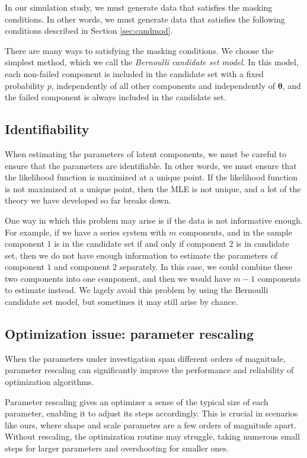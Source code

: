 \documentclass[
]{article}
\begin{document}
In our simulation study, we must generate data that satisfies the
masking conditions. In other words, we must generate data that satisfies
the following conditions described in Section \ref{sec:candmod}.

There are many ways to satisfying the masking conditions. We choose the
simplest method, which we call the \emph{Bernoulli candidate set model}.
In this model, each non-failed component is included in the candidate
set with a fixed probability \(p\), independently of all other
components and independently of \(\boldsymbol{\theta}\), and the failed
component is always included in the candidate set.

\hypertarget{identifiability}{%
\subsection{Identifiability}\label{identifiability}}

When estimating the parameters of latent components, we must be careful
to ensure that the parameters are identifiable. In other words, we must
ensure that the likelihood function is maximized at a unique point. If
the likelihood function is not maximized at a unique point, then the MLE
is not unique, and a lot of the theory we have developed so far breaks
down.

One way in which this problem may arise is if the data is not
informative enough. For example, if we have a series system with \(m\)
components, and in the sample component \(1\) is in the candidate set if
and only if component \(2\) is in candidate set, then we do not have
enough information to estimate the parameters of component \(1\) and
component \(2\) separately. In this case, we could combine these two
components into one component, and then we would have \(m-1\) components
to estimate instead. We lagely avoid this problem by using the Bernoulli
candidate set model, but sometimes it may still arise by chance.

\hypertarget{sec:opt_rescale}{%
\subsection{Optimization issue: parameter
rescaling}\label{sec:opt_rescale}}

When the parameters under investigation span different orders of
magnitude, parameter rescaling can significantly improve the performance
and reliability of optimization algorithms.

Parameter rescaling gives an optimizer a sense of the typical size of
each parameter, enabling it to adjust its steps accordingly. This is
crucial in scenarios like ours, where shape and scale parametes are a
few orders of magnitude apart. Without rescaling, the optimization
routine may struggle, taking numerous small steps for larger parameters
and overshooting for smaller ones.
\end{document}
